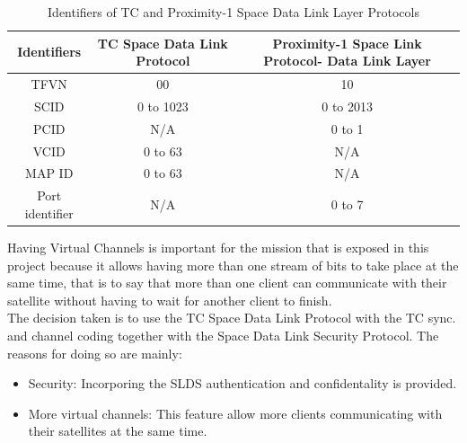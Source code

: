 \begin{table}[H]
\begin{center}
\begin{tabular}{|c|c|c|}
\hline
Identifiers&TC Space Data Link Protocol&Proximity-1 Space Link Protocol- Data Link Layer\\
\hline
TFVN&00&10\\
\hline
SCID&0 to 1023&0 to 2013\\
\hline
PCID&N/A&0 to 1\\
\hline
VCID&0 to 63&N/A\\
\hline
MAP ID&0 to 63&N/A\\
\hline
Port identifier&N/A&0 to 7\\
\hline
\end{tabular}
\caption{Identifiers of TC and Proximity-1 Space Data Link Layer Protocols}
\end{center}
\end{table} 
Having Virtual Channels is important for the mission that is exposed in this project because it allows having more than one stream of bits to take place at the same time, that is to say that more than one client can communicate with their satellite without having to wait for another client to finish.\\
The decision taken is to use the TC Space Data Link Protocol with the TC sync. and channel coding together with the Space Data Link Security Protocol. The reasons for doing so are mainly:
\begin{itemize}
\item Security: Incorporing the SLDS authentication and confidentality is provided.
\item More virtual channels: This feature allow more clients communicating with their satellites at the same time.
\end{itemize}
